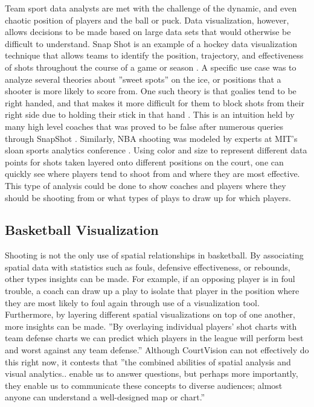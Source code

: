 \documentclass[sigconf]{acmart}
\begin{document}
Team sport data analysts are met with the challenge of the dynamic, and even chaotic position of players and the ball or puck. Data visualization, however, allows decisions to be made based on large data sets that would otherwise be difficult to understand. Snap Shot is an example of a hockey data visualization technique that allows teams to identify the position, trajectory, and effectiveness of shots throughout the course of a game or season \cite{SnapShot}. A specific use case was to analyze several theories about ''sweet spots'' on the ice, or positions that a shooter is more likely to score from. One such theory is that goalies tend to be right handed, and that makes it more difficult for them to block shots from their right side due to holding their stick in that hand \cite{SnapShot}. This is an intuition held by many high level coaches that was proved to be false after numerous queries through SnapShot \cite{SnapShot}. Similarly, NBA shooting was modeled by experts at MIT's sloan sports analytics conference \cite{CourtVision}. Using color and size to represent different data points for shots taken layered onto different positions on the court, one can quickly see where players tend to shoot from and where they are most effective. This type of analysis could be done to show coaches and players where they should be shooting from or what types of plays to draw up for which players.

\subsection{Basketball Visualization}

Shooting is not the only use of spatial relationships in basketball. By associating spatial data with statistics such as fouls, defensive effectiveness, or rebounds, other types insights can be made. For example, if an opposing player is in foul trouble, a coach can draw up a play to isolate that player in the position where they are most likely to foul again through use of a visualization tool. Furthermore, by layering different spatial visualizations on top of one another, more insights can be made. ''By overlaying individual players' shot charts with team defense charts we can predict which players in the league will perform best and worst against any team defense.'' \cite{CourtVision} Although CourtVision can not effectively do this right now, it contests that ''the combined abilities of spatial analysis and visual analytics.. enable us to answer questions, but perhaps more importantly, they enable us to communicate these concepts to diverse audiences; almost anyone can understand a well-designed map or chart.''\cite{CourtVision}
\end{document}
